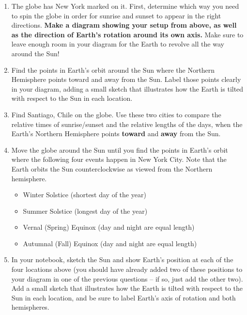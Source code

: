 \documentclass[11pt]{article}%
\begin{document}
\begin{enumerate}

\item The globe has New York marked on it. First, determine which way you need to spin the globe in order for sunrise and sunset to appear in the right directions. \textbf{Make a diagram showing your setup from above, as well as the direction of Earth's rotation around its own axis.} Make sure to leave enough room in your diagram for the Earth to revolve all the way around the Sun!

\item Find the points in Earth's orbit around the Sun where the Northern Hemisphere points toward and away from the Sun. Label those points clearly in your diagram, adding a small sketch that illustrates how the Earth is tilted with respect to the Sun in each location.

\item Find Santiago, Chile on the globe.  Use these two cities to compare the relative times of sunrise/sunset and the relative lengths of the days, when the Earth's Northern Hemisphere points \textbf{toward} and \textbf{away} from the Sun.

\item Move the globe around the Sun until you find the points in Earth's orbit where the following four events happen in New York City. Note that the Earth orbits the Sun counterclockwise as viewed from the Northern hemisphere.
    \begin{itemize}
    \item Winter Solstice (shortest day of the year)
    \item Summer Solstice (longest day of the year)
    \item Vernal (Spring) Equinox (day and night are equal length)
    \item Autumnal (Fall) Equinox (day and night are equal length)
    \end{itemize}
\item In your notebook, sketch the Sun and show Earth's position at each of the four locations above (you should have already added two of these positions to your diagram in one of the previous questions -- if so, just add the other two). Add a small sketch that illustrates how the Earth is tilted with respect to the Sun in each location, and be sure to label Earth's axis of rotation and both hemispheres.


\end{enumerate}
\end{document}
